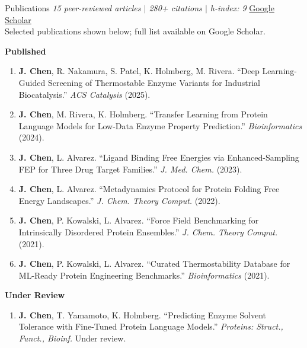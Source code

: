 \documentclass{cv}
\begin{document}
\begin{rSection}{Publications}
\textit{15 peer-reviewed articles $|$ 280+ citations $|$ h-index: 9} \hfill \href{https://scholar.google.com/citations?user=XXXXXXXXX}{Google Scholar}\\
\vspace{0.07cm}
Selected publications shown below; full list available on Google Scholar.
\vspace{0.15cm}

\textbf{Published}
\begin{enumerate}[leftmargin=1.5em, labelsep=0.5em, itemsep=0.1em]
\item[6.] \textbf{J. Chen}, R. Nakamura, S. Patel, K. Holmberg, M. Rivera. ``Deep Learning-Guided Screening of Thermostable Enzyme Variants for Industrial Biocatalysis.'' \textit{ACS Catalysis} (2025).
\item[5.] \textbf{J. Chen}, M. Rivera, K. Holmberg. ``Transfer Learning from Protein Language Models for Low-Data Enzyme Property Prediction.'' \textit{Bioinformatics} (2024).
\item[4.] \textbf{J. Chen}, L. Alvarez. ``Ligand Binding Free Energies via Enhanced-Sampling FEP for Three Drug Target Families.'' \textit{J. Med. Chem.} (2023).
\item[3.] \textbf{J. Chen}, L. Alvarez. ``Metadynamics Protocol for Protein Folding Free Energy Landscapes.'' \textit{J. Chem. Theory Comput.} (2022).
\item[2.] \textbf{J. Chen}, P. Kowalski, L. Alvarez. ``Force Field Benchmarking for Intrinsically Disordered Protein Ensembles.'' \textit{J. Chem. Theory Comput.} (2021).
\item[1.] \textbf{J. Chen}, P. Kowalski, L. Alvarez. ``Curated Thermostability Database for ML-Ready Protein Engineering Benchmarks.'' \textit{Bioinformatics} (2021).
\end{enumerate}

\textbf{Under Review}
\begin{enumerate}[leftmargin=1.5em, labelsep=0.5em, itemsep=0.1em]
\item[--] \textbf{J. Chen}, T. Yamamoto, K. Holmberg. ``Predicting Enzyme Solvent Tolerance with Fine-Tuned Protein Language Models.'' \textit{Proteins: Struct., Funct., Bioinf.} Under review.
\end{enumerate}
\end{rSection}
\end{document}

